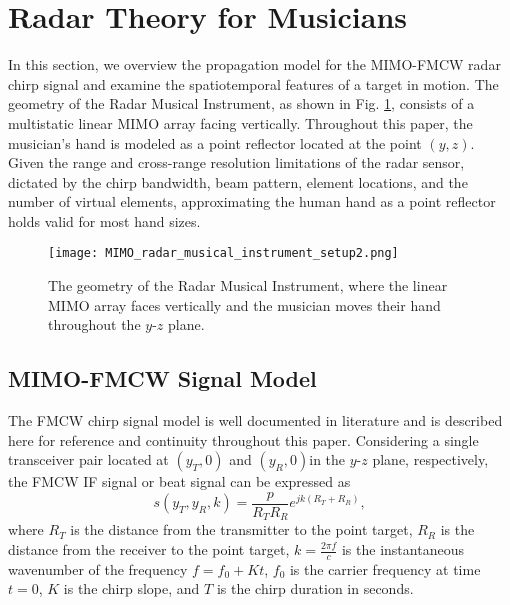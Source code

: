 \documentclass[10pt,journal,final]{IEEEtran}
\begin{document}
\section{Radar Theory for Musicians}
\label{sec:radar_theory_for_musicians}
In this section, we overview the propagation model for the MIMO-FMCW radar chirp signal and examine the spatiotemporal features of a target in motion. The geometry of the Radar Musical Instrument, as shown in Fig. \ref{fig:MIMO_radar_musical_instrument_setup}, consists of a multistatic linear MIMO array facing vertically. Throughout this paper, the musician's hand is modeled as a point reflector located at the point $(y,z)$. Given the range and cross-range resolution limitations of the radar sensor, dictated by the chirp bandwidth, beam pattern, element locations, and the number of virtual elements, approximating the human hand as a point reflector holds valid for most hand sizes.

\begin{figure}[h]
	\centering
	\texttt{[image: MIMO\_radar\_musical\_instrument\_setup2.png]}
	\caption{The geometry of the Radar Musical Instrument, where the linear MIMO array faces vertically and the musician moves their hand throughout the $y$-$z$ plane.}
	\label{fig:MIMO_radar_musical_instrument_setup}
\end{figure} 

\subsection{MIMO-FMCW Signal Model}
\label{subsec:signal_model}
The FMCW chirp signal model is well documented in literature \cite{josiah:isar} and is described here for reference and continuity throughout this paper. Considering a single transceiver pair located at $(y_T,0)$ and $(y_R,0) $in the $y$-$z$ plane, respectively, the FMCW IF signal or beat signal can be expressed as \cite{muhammet:sparse}
\begin{equation}
	\label{eq:mimo_beat_signal}
	s(y_T,y_R,k) = \frac{p}{R_T R_R} e^{jk(R_T + R_R)},
\end{equation}
where $R_T$ is the distance from the transmitter to the point target, $R_R$ is the distance from the receiver to the point target, $k = \frac{2\pi f}{c}$ is the instantaneous wavenumber of the frequency $f = f_0 + Kt$, $f_0$ is the carrier frequency at time $t = 0$, $K$ is the chirp slope, and $T$ is the chirp duration in seconds.
\end{document}
